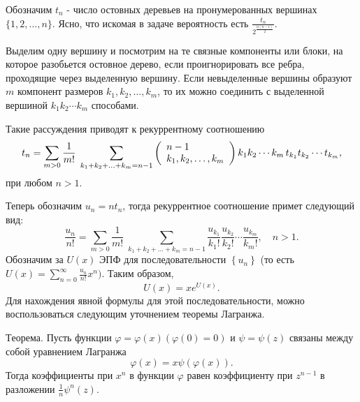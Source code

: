 \begin{ordre}

Обозначим $t_n $ - число остовных деревьев на пронумерованных вершинах 
$\{1,2,\ldots ,n\}$. Ясно, что искомая в задаче вероятность есть $\frac{t_n 
}{2^{\frac{n(n-1)}{2}}}$.

Выделим одну вершину и посмотрим на те связные компоненты или блоки, на 
которое разобьется остовное дерево, если проигнорировать все ребра, 
проходящие через выделенную вершину. Если невыделенные вершины образуют $m$ 
компонент размеров $k_1 ,k_2 ,\ldots ,k_m $, то их можно соединить с 
выделенной вершиной $k_1 k_2 \cdots k_m $ способами.

Такие рассуждения приводят к рекуррентному соотношению
\[
t_n =\sum\limits_{m>0} {\frac{1}{m!}} \;\sum\limits_{k_1 +k_2 +\ldots +k_m 
=n-1} {\left( {{\begin{array}{*{20}c}
 {n-1} \hfill \\
 {k_1 ,k_2 ,\ldots ,k_m } \hfill \\
\end{array} }} \right)} \,k_1 k_2 \cdots k_m \,t_{k_1 } t_{k_2 } \cdots 
t_{k_m } ,
\]
при любом $n>1$. 

Теперь обозначим $u_n =nt_n $, тогда рекуррентное соотношение примет 
следующий вид:
\[
\frac{u_n }{n!}=\sum\limits_{m>0} {\frac{1}{m!}} \;\sum\limits_{k_1 +k_2 
+\ldots +k_m =n-1} {\frac{u_{k_1 } }{k_1 !}\frac{u_{k_2 } }{k_2 !}\cdots 
\frac{u_{k_m } }{k_m !}} ,\quad n>1.
\]
Обозначим за $U(x)$ ЭПФ для последовательности $\left\{ {u_n } \right\}$ (то 
есть $U(x)=\sum\limits_{n=0}^\infty {\frac{u_n }{n!}x^n} )$. Таким образом,
\[
U(x)=xe^{U(x)}.
\]
Для нахождения явной формулы для этой последовательности, можно 
воспользоваться следующим уточнением теоремы Лагранжа.

$Теорема.$ Пусть функции $\varphi =\varphi (x)(\varphi (0)=0)$ и $\psi =\psi 
(z)$ связаны между собой уравнением Лагранжа
\[
\varphi (x)=x\psi \left( {\varphi (x)} \right).
\]
Тогда коэффициенты при $x^n$ в функции $\varphi $ равен коэффициенту при 
$z^{n-1}$ в разложении $\frac{1}{n}\psi ^n(z)$.

\end{ordre}


